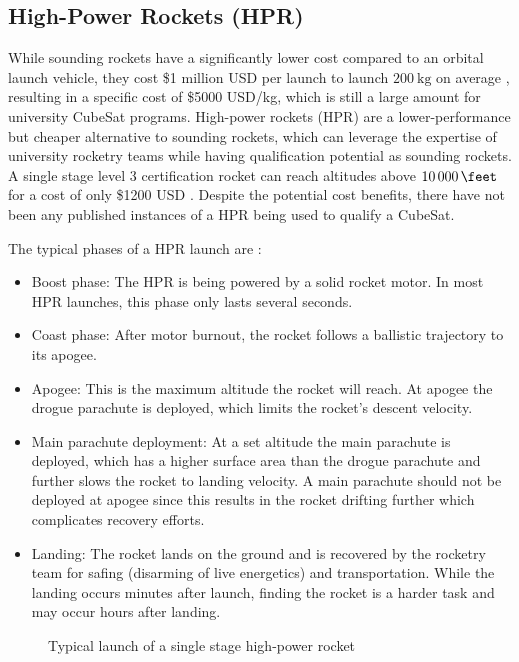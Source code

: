 \documentclass{report}
\begin{document}
\subsection{High-Power Rockets (HPR)}
While sounding rockets have a significantly lower cost compared to an orbital launch vehicle, they cost \$1 million USD per launch to launch $\SI{200}{\kilo\gram}$ on average \cite{jurist2009commercial}, resulting in a specific cost of \$5000 USD/kg, which is still a large amount for university CubeSat programs. High-power rockets (HPR) are a lower-performance but cheaper alternative to sounding rockets, which can leverage the expertise of university rocketry teams while having qualification potential as sounding rockets. A single stage level 3 certification rocket can reach altitudes above $\SI{10000}{\feet}$ \cite{canepa2005modern} for a cost of only \$1200 USD \cite{canepa2005modern}. Despite the potential cost benefits, there have not been any published instances of a HPR being used to qualify a CubeSat.

The typical phases of a HPR launch are \cite{canepa2005modern}:

\begin{itemize} %
  \item Boost phase: The HPR is being powered by a solid rocket motor. In most HPR launches, this phase only lasts several seconds.
  \item Coast phase: After motor burnout, the rocket follows a ballistic trajectory to its apogee.
  \item Apogee: This is the maximum altitude the rocket will reach. At apogee the drogue parachute is deployed, which limits the rocket's descent velocity.
  \item Main parachute deployment: At a set altitude the main parachute is deployed, which has a higher surface area than the drogue parachute and further slows the rocket to landing velocity. A main parachute should not be deployed at apogee since this results in the rocket drifting further which complicates recovery efforts.
  \item Landing: The rocket lands on the ground and is recovered by the rocketry team for safing (disarming of live energetics) and transportation. While the landing occurs minutes after launch, finding the rocket is a harder task and may occur hours after landing.
\end{itemize}

\begin{figure}[H]
  \centering
  
  \caption{Typical launch of a single stage high-power rocket}
  \label{fig:rocket_flight}
\end{figure}
\end{document}
